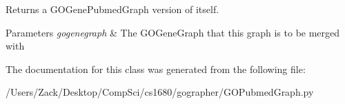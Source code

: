 Returns a G\-O\-Gene\-Pubmed\-Graph version of itself. 


\begin{DoxyParams}{Parameters}
{\em gogenegraph} & The G\-O\-Gene\-Graph that this graph is to be merged with \\
\hline
\end{DoxyParams}


The documentation for this class was generated from the following file\-:\begin{DoxyCompactItemize}
\item 
/\-Users/\-Zack/\-Desktop/\-Comp\-Sci/cs1680/gographer/G\-O\-Pubmed\-Graph.\-py\end{DoxyCompactItemize}
